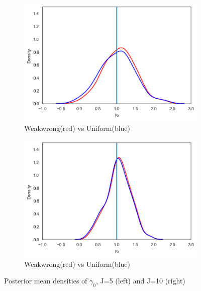 \begin{figure}[H]
  \centering
  \begin{subfigure}[b]{0.4\linewidth}
    \includegraphics[width=\linewidth]{graphics/mean_plot_gamma0_unib_weakwrongr}
    \caption{Weakwrong(red) vs Uniform(blue)}
  \end{subfigure}
  \begin{subfigure}[b]{0.4\linewidth}
    \includegraphics[width=\linewidth]{graphics/mean_plot_gamma0_unib_weakwrongr2}
    \caption{Weakwrong(red) vs Uniform(blue)}
  \end{subfigure}
  \caption{Posterior mean densities of $\gamma_0$, J=5 (left) and J=10 (right)}
  \label{fig:weak_uni}
\end{figure}


